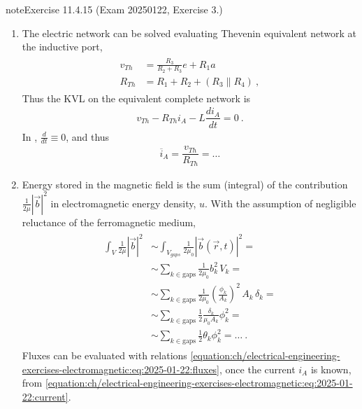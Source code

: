 \documentclass[letterpaper,10pt,english]{jupyterBook}
\begin{document}
\begin{sphinxadmonition}{note}{Exercise 11.4.15 (Exam 2025\sphinxhyphen{}01\sphinxhyphen{}22, Exercise 3.)}
\begin{enumerate}
\item {} 
\sphinxAtStartPar
The electric network can be solved evaluating Thevenin equivalent network at the inductive port,
\begin{equation*}
\begin{split}\begin{aligned}
     v_{Th} & = \frac{R_3}{R_2 + R_3} e + R_1 a \\
     R_{Th} & = R_1 + R_2 + \left( R_3 \parallel R_4 \right) \ ,
   \end{aligned}\end{split}
\end{equation*}
\sphinxAtStartPar
Thus the KVL on the equivalent complete network is
\begin{equation*}
\begin{split}v_{Th} - R_{Th} i_A - L \dfrac{d i_A}{d t} = 0 \ . \end{split}
\end{equation*}
\sphinxAtStartPar
In , \(\frac{d}{dt} \equiv 0\), and thus
\begin{equation}\label{equation:ch/electrical-engineering-exercises-electromagnetic:eq:2025-01-22:current}
\begin{split}\overline{i}_A = \dfrac{v_{Th}}{R_{Th}} = \dots \end{split}
\end{equation}
\item {} 
\sphinxAtStartPar
Energy stored in the magnetic field is the sum (integral) of the contribution \(\frac{1}{2 \mu} \left|\vec{b}\right|^2\) in electromagnetic energy density, \(u\). With the assumption of negligible reluctance of the ferromagnetic medium,
\begin{equation*}
\begin{split}\begin{aligned}
     \int_{V} \frac{1}{2 \mu} \left| \vec{b} \right|^2 
     & \sim \int_{V_{gaps}} \frac{1}{2 \mu_0} \left| \vec{b}(\vec{r},t) \right|^2 = \\
     & \sim \sum_{k \in \text{gaps}} \frac{1}{2 \mu_0} b_k^2 \, V_k = \\
     & \sim \sum_{k \in \text{gaps}} \frac{1}{2 \mu_0} \left(\frac{\phi_k}{A_k}\right)^2 \, A_k \, \delta_k = \\
     & \sim \sum_{k \in \text{gaps}} \frac{1}{2} \frac{\delta_k}{\mu_0 A_k} \phi_k^2 = \\
     & \sim \sum_{k \in \text{gaps}} \frac{1}{2} \theta_k \phi_k^2 = \dots \ .
   \end{aligned}\end{split}
\end{equation*}
\sphinxAtStartPar
Fluxes can be evaluated with relations \eqref{equation:ch/electrical-engineering-exercises-electromagnetic:eq:2025-01-22:fluxes}, once the current \(i_A\) is known, from \eqref{equation:ch/electrical-engineering-exercises-electromagnetic:eq:2025-01-22:current}.


\end{enumerate}
\end{sphinxadmonition}
\end{document}
